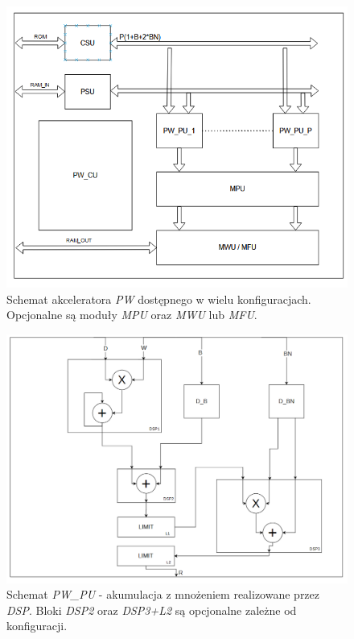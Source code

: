 \begin{figure}
    \centering
    \includegraphics[width=0.9\linewidth]{images/PWACC.png}
    \caption{Schemat akceleratora \emph{PW} dostępnego w wielu konfiguracjach.
    Opcjonalne są moduły \emph{MPU} oraz \emph{MWU} lub \emph{MFU}.}
    \label{fig:pwacc}
\end{figure}
\begin{figure}
    \centering
    \includegraphics[width=0.9\linewidth]{images/PW_PU.png}
    \caption{Schemat \emph{PW\_PU} - akumulacja z mnożeniem realizowane przez \emph{DSP}. Bloki \emph{DSP2} oraz \emph{DSP3+L2} są opcjonalne zależne od konfiguracji.}
    \label{fig:pwpu}
\end{figure}





